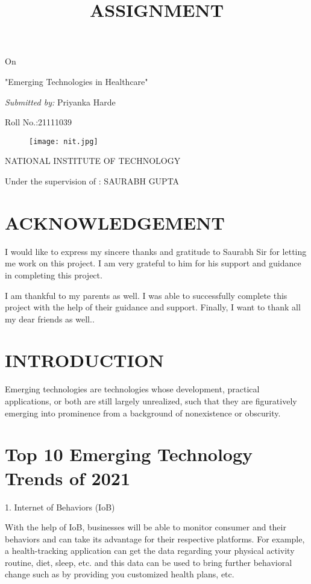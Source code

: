 \documentclass[11pt]{article}
\title{\Huge \textbf{ASSIGNMENT}}
\begin{document}
\maketitle
\centering On

\Huge "Emerging Technologies in Healthcare"
\setlength{\parskip}{0.5em}

\emph{\large Submitted by:}
\large Priyanka Harde

\large Roll No.:21111039
\begin{figure}[h]
\begin{center}
\texttt{[image: nit.jpg]}
\end{center}
\end{figure}

\textsc{\Large NATIONAL INSTITUTE OF TECHNOLOGY}

\large Under the supervision of : SAURABH GUPTA 
\clearpage 
\tableofcontents
\clearpage
\section{\huge  ACKNOWLEDGEMENT}
\Large \raggedright I would like to express my sincere thanks and gratitude to Saurabh Sir for letting me work on this project. I am very grateful to him for his support and guidance in completing this project.

I am thankful to my parents as well. I was able to successfully complete this project with the help of their guidance and support. Finally, I want to thank all my dear friends as well..

\section{\textbf{\huge INTRODUCTION}}
\raggedright Emerging technologies are technologies whose development, practical applications, or both are still largely unrealized, such that they are figuratively emerging into prominence from a background of nonexistence or obscurity.
\section{\huge Top 10 Emerging Technology Trends of 2021}

1. Internet of Behaviors (IoB)

 With the help of IoB, businesses will be able to monitor consumer and their behaviors and can take its advantage for their respective platforms. For example, a health-tracking application can get the data regarding your physical activity routine, diet, sleep, etc. and this data can be used to bring further behavioral change such as by providing you customized health plans, etc.
 
\end{document}
